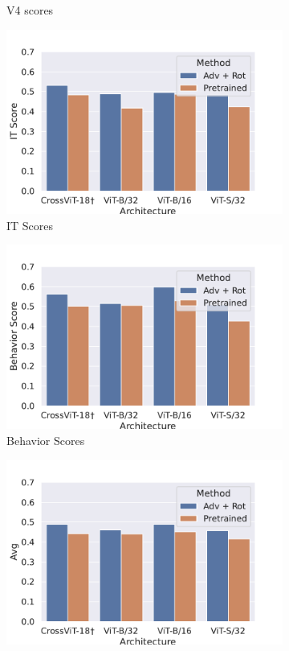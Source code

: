 \documentclass{article} %
\begin{document}
\begin{figure}[!h]
\begin{subfigure}{0.33\textwidth}
  \caption{V4 scores}
  \label{fig:3}
\end{subfigure}
\medskip
\begin{subfigure}{0.33\textwidth}
  \includegraphics[width=\linewidth]{src/brainscores/brainscore_IT.pdf}
  \caption{IT Scores}
  \label{fig:4}
\end{subfigure}\hfil %
\begin{subfigure}{0.33\textwidth}
  \includegraphics[width=\linewidth]{src/brainscores/brainscore_behavior.pdf}
  \caption{Behavior Scores}
  \label{fig:5}
\end{subfigure}\hfil %
\begin{subfigure}{0.33\textwidth}
  \includegraphics[width=\linewidth]{src/brainscores/brainscore_average.pdf}

\end{subfigure}
\end{figure}
\end{document}
